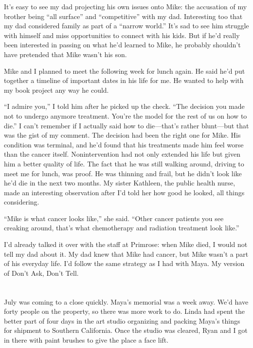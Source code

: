 \documentclass[12pt]{book}
\begin{document}
It's easy to see my dad projecting his own issues onto Mike: the accusation of my brother being ``all surface'' and ``competitive'' with my dad. Interesting too that my dad considered family as part of a ``narrow world.'' It's sad to see him struggle with himself and miss opportunities to connect with his kids. But if he'd really been interested in passing on what he'd learned to Mike, he probably shouldn't have pretended that Mike wasn't his son.

Mike and I planned to meet the following week for lunch again. He said he'd put together a timeline of important dates in his life for me. He wanted to help with my book project any way he could.

``I admire you,'' I told him after he picked up the check. ``The decision you made not to undergo anymore treatment. You're the model for the rest of us on how to die.'' I can't remember if I actually said how to die---that's rather blunt---but that was the gist of my comment. The decision had been the right one for Mike. His condition was terminal, and he'd found that his treatments made him feel worse than the cancer itself. Nonintervention had not only extended his life but given him a better quality of life. The fact that he was still walking around, driving to meet me for lunch, was proof. He was thinning and frail, but he didn't look like he'd die in the next two months. My sister Kathleen, the public health nurse, made an interesting observation after I'd told her how good he looked, all things considering.

``Mike is what cancer looks like,'' she said. ``Other cancer patients you see creaking around, that's what chemotherapy and radiation treatment look like.''

I'd already talked it over with the staff at Primrose: when Mike died, I would not tell my dad about it. My dad knew that Mike had cancer, but Mike wasn't a part of his everyday life. I'd follow the same strategy as I had with Maya. My version of Don't Ask, Don't Tell. 


\chapter{}

July was coming to a close quickly. Maya's memorial was a week away. We'd have forty people on the property, so there was more work to do. Linda had spent the better part of four days in the art studio organizing and packing Maya's things for shipment to Southern California. Once the studio was cleared, Ryan and I got in there with paint brushes to give the place a face lift.
\end{document}
